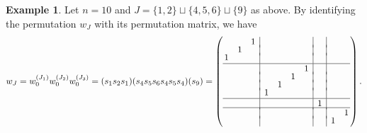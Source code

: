 \documentclass[11pt]{article}
\theoremstyle{definition}
\newtheorem{exam}[theo]{Example}
\numberwithin{equation}{section}
\numberwithin{equation}{section}
\begin{document}
\begin{exam}\label{eg: wJ}
{\rm
Let $n=10$ and $J=\{1,2\} \sqcup\{4,5,6\} \sqcup\{9\}$ as above. By identifying the permutation $w_J$ with its permutation matrix, we have 
\begin{align*}
 w_J 
 = w_0^{(J_1)} w_0^{(J_2)} w_0^{(J_3)} 
 = (s_1s_2s_1) (s_4s_5s_6s_4s_5s_4) (s_9)
 =
 \left(
 \begin{array}{@{\,}ccc|cccc|c|cc@{\,}}\vspace{-3pt}
     & & 1 & & & & & & & \\ 
     & 1 & & & & & & & & \vspace{-3pt}\\ 
    1 & & & & & & & & & \\ \hline
     & & & & & & 1& & &  \vspace{-3pt}\\
     & & & & & 1 & & & & \vspace{-3pt}\\
     & & & & 1 & & & & & \vspace{-3pt}\\
     & & & 1 & & & & & & \\ \hline 
     & & & & & & & 1 & & \vspace{-2pt}\\ \hline
     & & & & & & & & & 1 \vspace{-3pt}\\
     & & & & & & & & 1 & 
 \end{array}
 \right).
\end{align*}}
\end{exam}
\end{document}
